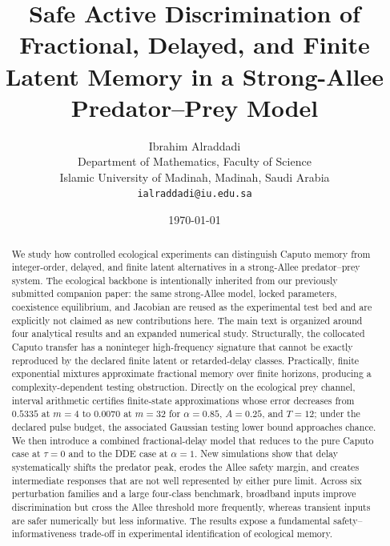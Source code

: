 \documentclass[9pt]{extarticle}
\title{Safe Active Discrimination of Fractional, Delayed, and Finite Latent Memory in a Strong-Allee Predator--Prey Model}
\author{Ibrahim Alraddadi\\
Department of Mathematics, Faculty of Science\\
Islamic University of Madinah, Madinah, Saudi Arabia\\
\texttt{ialraddadi@iu.edu.sa}}
\date{\today}
\begin{document}
\maketitle

\begin{abstract}
We study how controlled ecological experiments can distinguish Caputo memory from integer-order, delayed, and finite latent alternatives in a strong-Allee predator--prey system. The ecological backbone is intentionally inherited from our previously submitted companion paper: the same strong-Allee model, locked parameters, coexistence equilibrium, and Jacobian are reused as the experimental test bed and are explicitly not claimed as new contributions here. The main text is organized around four analytical results and an expanded numerical study. Structurally, the collocated Caputo transfer has a noninteger high-frequency signature that cannot be exactly reproduced by the declared finite latent or retarded-delay classes. Practically, finite exponential mixtures approximate fractional memory over finite horizons, producing a complexity-dependent testing obstruction. Directly on the ecological prey channel, interval arithmetic certifies finite-state approximations whose error decreases from $0.5335$ at $m=4$ to $0.0070$ at $m=32$ for $\alpha=0.85$, $A=0.25$, and $T=12$; under the declared pulse budget, the associated Gaussian testing lower bound approaches chance. We then introduce a combined fractional-delay model that reduces to the pure Caputo case at $\tau=0$ and to the DDE case at $\alpha=1$. New simulations show that delay systematically shifts the predator peak, erodes the Allee safety margin, and creates intermediate responses that are not well represented by either pure limit. Across six perturbation families and a large four-class benchmark, broadband inputs improve discrimination but cross the Allee threshold more frequently, whereas transient inputs are safer numerically but less informative. The results expose a fundamental safety--informativeness trade-off in experimental identification of ecological memory.
\end{abstract}

\theoremstyle{plain}
\newtheorem{theorem}{Theorem}[section]
\newtheorem{lemma}[theorem]{Lemma}
\newtheorem{corollary}[theorem]{Corollary}
\theoremstyle{definition}
\newtheorem{definition}[theorem]{Definition}
\theoremstyle{remark}
\newtheorem{remark}[theorem]{Remark}















\end{document}
